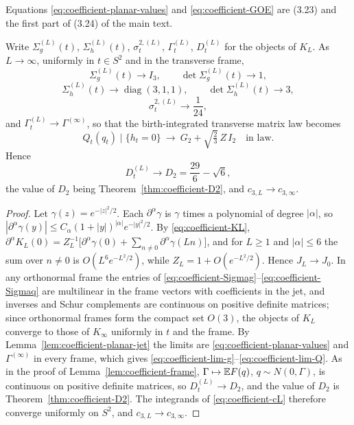 Equations \eqref{eq:coefficient-planar-values} and \eqref{eq:coefficient-GOE} are (3.23) and the first part of (3.24) of the main text.

\begin{proposition}\label{prop:coefficient-planar-limit}
Write $\Sigma_g^{(L)}(t)$, $\Sigma_h^{(L)}(t)$, $\sigma_t^{2,(L)}$, $\Gamma_t^{(L)}$, $D_t^{(L)}$ for the objects of $K_L$. As $L\to\infty$, uniformly in $t\in S^2$ and in the transverse frame,
\begin{equation}\label{eq:coefficient-lim-g}
\Sigma_g^{(L)}(t)\to I_3,\qquad \det\Sigma_g^{(L)}(t)\to1,
\end{equation}
\begin{equation}\label{eq:coefficient-lim-h}
\Sigma_h^{(L)}(t)\to\operatorname{diag}(3,1,1),\qquad \det\Sigma_h^{(L)}(t)\to3,
\end{equation}
\begin{equation}\label{eq:coefficient-lim-sigma}
\sigma_t^{2,(L)}\to\frac1{24},
\end{equation}
and $\Gamma_t^{(L)}\to\Gamma^{(\infty)}$, so that the birth-integrated transverse matrix law becomes
\begin{equation}\label{eq:coefficient-lim-Q}
Q_t(q_t)\mid\{h_t=0\}\ \longrightarrow\ G_2+\sqrt{\tfrac23}\,Z\,I_2\quad\text{in law}.
\end{equation}
Hence
\begin{equation}\label{eq:coefficient-lim-D}
D_t^{(L)}\to D_2=\frac{29}{6}-\sqrt6,
\end{equation}
the value of $D_2$ being Theorem~\ref{thm:coefficient-D2}, and $c_{3,L}\to c_{3,\infty}$.
\end{proposition}

\begin{proof}
Let $\gamma(z)=e^{-|z|^2/2}$. Each $\partial^\alpha\gamma$ is $\gamma$ times a polynomial of degree $|\alpha|$, so $|\partial^\alpha\gamma(y)|\le C_\alpha(1+|y|)^{|\alpha|}e^{-|y|^2/2}$. By \eqref{eq:coefficient-KL}, $\partial^\alpha K_L(0)=Z_L^{-1}\bigl[\partial^\alpha\gamma(0)+\sum_{n\ne0}\partial^\alpha\gamma(Ln)\bigr]$, and for $L\ge1$ and $|\alpha|\le6$ the sum over $n\ne0$ is $O(L^6e^{-L^2/2})$, while $Z_L=1+O(e^{-L^2/2})$. Hence $J_L\to J_0$. In any orthonormal frame the entries of \eqref{eq:coefficient-Sigmag}--\eqref{eq:coefficient-Sigmaq} are multilinear in the frame vectors with coefficients in the jet, and inverses and Schur complements are continuous on positive definite matrices; since orthonormal frames form the compact set $O(3)$, the objects of $K_L$ converge to those of $K_\infty$ uniformly in $t$ and the frame. By Lemma~\ref{lem:coefficient-planar-jet} the limits are \eqref{eq:coefficient-planar-values} and $\Gamma^{(\infty)}$ in every frame, which gives \eqref{eq:coefficient-lim-g}--\eqref{eq:coefficient-lim-Q}. As in the proof of Lemma~\ref{lem:coefficient-frame}, $\Gamma\mapsto\mathbb E F(q)$, $q\sim N(0,\Gamma)$, is continuous on positive definite matrices, so $D_t^{(L)}\to D_2$, and the value of $D_2$ is Theorem~\ref{thm:coefficient-D2}. The integrands of \eqref{eq:coefficient-cL} therefore converge uniformly on $S^2$, and $c_{3,L}\to c_{3,\infty}$.
\end{proof}


